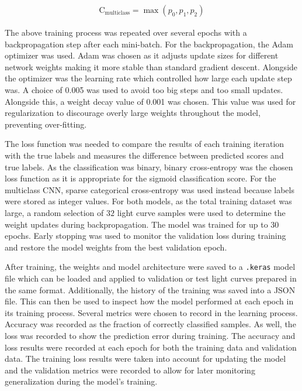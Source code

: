\begin{align}
    \text{C}_{\text{multiclass}} = \max{(p_0, p_1, p_2)}\label{eq:mc_confidence}
\end{align}

The above training process was repeated over several epochs with a backpropagation step after each mini-batch. For the backpropagation, the Adam optimizer was used. Adam was chosen as it adjusts update sizes for different network weights making it more stable than standard gradient descent. Alongside the optimizer was the learning rate which controlled how large each update step was. A choice of 0.005 was used to avoid too big steps and too small updates. Alongside this, a weight decay value of 0.001 was chosen. This value was used for regularization to discourage overly large weights throughout the model, preventing over-fitting.

The loss function was needed to compare the results of each training iteration with the true labels and measures the difference between predicted scores and true labels. As the classification was binary, binary cross-entropy was the chosen loss function as it is appropriate for the sigmoid classification score. For the multiclass CNN, sparse categorical cross-entropy was used instead because labels were stored as integer values. For both models, as the total training dataset was large, a random selection of $32$ light curve samples were used to determine the weight updates during backpropagation. The model was trained for up to 30 epochs. Early stopping was used to monitor the validation loss during training and restore the model weights from the best validation epoch.

After training, the weights and model architecture were saved to a \texttt{.keras} model file which can be loaded and applied to validation or test light curves prepared in the same format. Additionally, the history of the training was saved into a JSON file. This can then be used to inspect how the model performed at each epoch in its training process. Several metrics were chosen to record in the learning process. Accuracy was recorded as the fraction of correctly classified samples. As well, the loss was recorded to show the prediction error during training. The accuracy and loss results were recorded at each epoch for both the training data and validation data. The training loss results were taken into account for updating the model and the validation metrics were recorded to allow for later monitoring generalization during the model's training.

